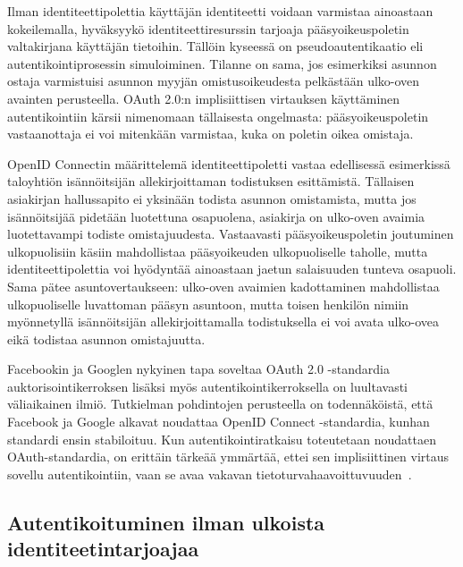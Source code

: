 \documentclass[finnish,gradu]{tktltiki}
\begin{document}
  Ilman identiteettipolettia käyttäjän identiteetti voidaan varmistaa ainoastaan kokeilemalla, hyväksyykö identiteettiresurssin tarjoaja pääsyoikeuspoletin valtakirjana käyttäjän tietoihin. Tällöin kyseessä on pseudoautentikaatio eli autentikointiprosessin simuloiminen. Tilanne on sama, jos esimerkiksi asunnon ostaja varmistuisi asunnon myyjän omistusoikeudesta pelkästään ulko-oven avainten perusteella. OAuth 2.0:n implisiittisen virtauksen käyttäminen autentikointiin kärsii nimenomaan tällaisesta ongelmasta: pääsyoikeuspoletin vastaanottaja ei voi mitenkään varmistaa, kuka on poletin oikea omistaja.

  OpenID Connectin määrittelemä identiteettipoletti vastaa edellisessä esimerkissä taloyhtiön isännöitsijän allekirjoittaman todistuksen esittämistä. Tällaisen asiakirjan hallussapito ei yksinään todista asunnon omistamista, mutta jos isännöitsijää pidetään luotettuna osapuolena, asiakirja on ulko-oven avaimia luotettavampi todiste omistajuudesta. Vastaavasti pääsyoikeuspoletin joutuminen ulkopuolisiin käsiin mahdollistaa pääsyoikeuden ulkopuoliselle taholle, mutta identiteettipolettia voi hyödyntää ainoastaan jaetun salaisuuden tunteva osapuoli. Sama pätee asuntovertaukseen: ulko-oven avaimien kadottaminen mahdollistaa ulkopuoliselle luvattoman pääsyn asuntoon, mutta toisen henkilön nimiin myönnetyllä isännöitsijän allekirjoittamalla todistuksella ei voi avata ulko-ovea eikä todistaa asunnon omistajuutta.

  Facebookin ja Googlen nykyinen tapa soveltaa OAuth 2.0 -standardia auktorisointikerroksen lisäksi myös autentikointikerroksella on luultavasti väliaikainen ilmiö. Tutkielman pohdintojen perusteella on todennäköistä, että Facebook ja Google alkavat noudattaa OpenID Connect -standardia, kunhan standardi ensin stabiloituu. Kun autentikointiratkaisu toteutetaan noudattaen OAuth-standardia, on erittäin tärkeää ymmärtää, ettei sen implisiittinen virtaus sovellu autentikointiin, vaan se avaa vakavan tietoturvahaavoittuvuuden~\cite{bradley_implicit_followup_2012, bradley_oauth_implicit_flow_vulnerability_2012}.





  \subsection{Autentikoituminen ilman ulkoista identiteetintarjoajaa} %
  \label{sub:autentikoituminen_käyttäjäkeskeisellä_identiteetillä}
\end{document}
